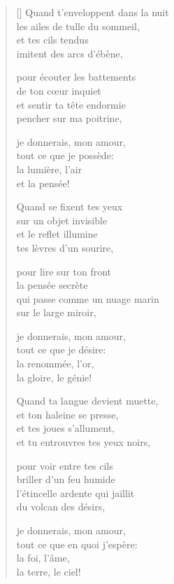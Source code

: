 \documentclass[a4paper,12pt]{book}
\begin{document}
\settowidth{\versewidth}{Quand t'enveloppent dans la nuit}

\begin{verse}[\versewidth]
  Quand t'enveloppent dans la nuit \\
  les ailes de tulle du sommeil, \\
  et tes cils tendus \\
  imitent des arcs d'ébène,

  pour écouter les battements \\
  de ton cœur inquiet \\
  et sentir ta tête endormie \\
  pencher sur ma poitrine,

  je donnerais, mon amour, \\
  tout ce que je possède: \\
  la lumière, l'air \\
  et la pensée!

  Quand se fixent tes yeux \\
  sur un objet invisible \\
  et le reflet illumine \\
  tes lèvres d'un sourire,

  pour lire sur ton front \\
  la pensée secrète \\
  qui passe comme un nuage marin \\
  sur le large miroir,

  je donnerais, mon amour, \\
  tout ce que je désire: \\
  la renommée, l'or, \\
  la gloire, le génie!

  Quand ta langue devient muette, \\
  et ton haleine se presse, \\
  et tes joues s'allument, \\
  et tu entrouvres tes yeux noirs,

  pour voir entre tes cils \\
  briller d'un feu humide \\
  l'étincelle ardente qui jaillit \\
  du volcan des désirs,

  je donnerais, mon amour, \\
  tout ce que en quoi j'espère: \\
  la foi, l'âme, \\
  la terre, le ciel!
\end{verse}
\end{document}
